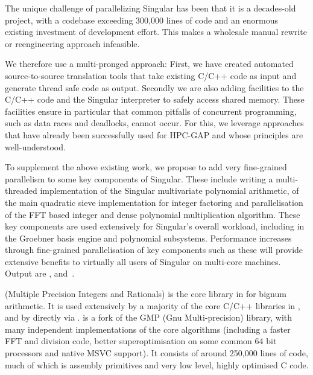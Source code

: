 \begin{workpackage}
\begin{tasklist}
\begin{task}[title=Singular,lead=UK, PM=47, id=hpc-singular,wphases=0-48!0.9,issue=102]
  The unique challenge of parallelizing Singular has been that it is a decades-old
  project, with a codebase exceeding 300,000 lines of code and an enormous existing
  investment of development effort. This makes a wholesale manual rewrite or reengineering
  approach infeasible.

  We therefore use a multi-pronged approach: First, we have created automated
  source-to-source translation tools that take existing C/C++ code as input and generate
  thread safe code as output. Secondly we are also adding facilities to the C/C++ code and
  the Singular interpreter to safely access shared memory. These facilities ensure in
  particular that common pitfalls of concurrent programming, such as data races and
  deadlocks, cannot occur. For this, we leverage approaches that have already been
  successfully used for HPC-GAP and whose principles are well-understood.

  To supplement the above existing work, we propose to add very fine-grained parallelism
  to some key components of Singular. These include writing a multi-threaded
  implementation of the Singular multivariate polynomial arithmetic, of the main quadratic
  sieve implementation for integer factoring and parallelisation of the FFT based integer
  and dense polynomial multiplication algorithm. These key components are used extensively
  for Singular's overall workload, including in the Groebner basis engine and polynomial
  subsystems. Performance increases through fine-grained parallelisation of key components
  such as these will provide extensive benefits to virtually all users of Singular on
  multi-core machines.
  Output are ,  and~.
\end{task}

\begin{task}[title=\MPIR,id=hpc-mpir, lead=UK,PM=13,wphases=6-18,issue=103]
\MPIR (Multiple Precision Integers and Rationals) is the core library in \Sage
for bignum arithmetic. It is used extensively by a majority of the core C/C++
libraries in \Sage, and by \Sage directly via \Cython. \MPIR is a fork of the 
GMP (Gnu Multi-precision) library, with many independent implementations of the
core algorithms (including a faster FFT and division code, better 
superoptimisation on some common 64 bit processors and native MSVC support). 
It consists of around 250,000 lines of code, much of which is assembly 
primitives and very low level, highly optimised C code.


\end{task}
\end{tasklist}
\end{workpackage}
